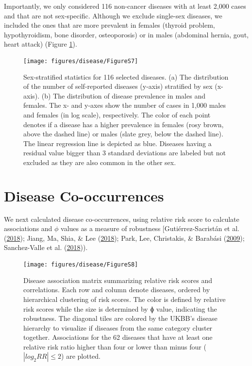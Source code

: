 \documentclass[12pt,twoside]{unicam}
\begin{document}
Importantly, we only considered 116 non-cancer diseases with at least 2,000 cases and that are not sex-specific. Although we exclude single-sex diseases, we included the ones that are more prevalent in females (thyroid problem, hypothyroidism, bone disorder, osteoporosis) or in males (abdominal hernia, gout, heart attack) (Figure \ref{fig:disFigS7}).

\begin{figure}

{\centering \texttt{[image: figures/disease/FigureS7]} 

}

\caption[Sex-stratified statistics for 116 selected diseases.]{Sex-stratified statistics for 116 selected diseases. (a) The distribution of the number of self-reported diseases (y-axis) stratified by sex (x-axis). (b) The distribution of disease prevalence in males and females. The x- and y-axes show the number of cases in 1,000 males and females (in log scale), respectively. The color of each point denotes if a disease has a higher prevalence in females (rosy brown, above the dashed line) or males (slate grey, below the dashed line). The linear regression line is depicted as blue. Diseases having a residual value bigger than 3 standard deviations are labeled but not excluded as they are also common in the other sex.}\label{fig:disFigS7}
\end{figure}

\hypertarget{disease-co-occurrences}{%
\section{Disease Co-occurrences}\label{disease-co-occurrences}}

We next calculated disease co-occurrences, using relative risk score to calculate associations and \(\phi\) values as a measure of robustness {[}Gutiérrez-Sacristán et al. (\protect\hyperlink{ref-Gutierrez-Sacristan2018}{2018}); Jiang, Ma, Shia, \& Lee (\protect\hyperlink{ref-Jiang2018}{2018}); Park, Lee, Christakis, \& Barabási (\protect\hyperlink{ref-Park2009}{2009}); Sanchez-Valle et al. (\protect\hyperlink{ref-Sanchez-Valle2018}{2018})).

\begin{figure}

{\centering \texttt{[image: figures/disease/FigureS8]} 

}

\caption[Disease association matrix summarizing relative risk scores and correlations.]{Disease association matrix summarizing relative risk scores and correlations. Each row and column denote diseases, ordered by hierarchical clustering of risk scores. The color is defined by relative risk scores while the size is determined by ɸ value, indicating the robustness. The diagonal tiles are colored by the UKBB's disease hierarchy to visualize if diseases from the same category cluster together. Associations for the 62 diseases that have at least one relative risk ratio higher than four or lower than minus four ($|log_2RR| ≤ 2$) are plotted.}\label{fig:disFigS8}
\end{figure}
\end{document}

